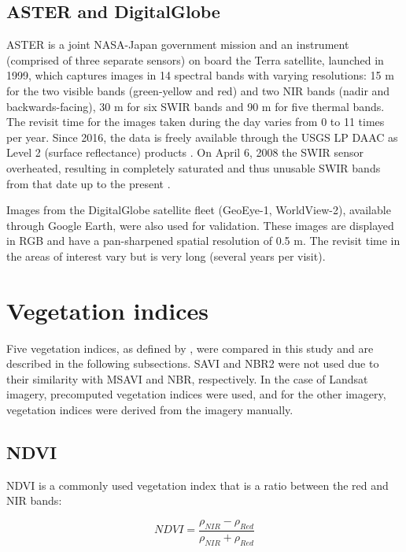 \documentclass[a4paper,12pt]{scrbook}
\begin{document}
\subsection{ASTER and DigitalGlobe}

\ac{ASTER} is a joint NASA-Japan government mission and an instrument (comprised of three separate sensors) on board the Terra satellite, launched in 1999, which captures images in 14 spectral bands with varying resolutions: 15 m for the two visible bands (green-yellow and red) and two \ac{NIR} bands (nadir and backwards-facing), 30 m for six \ac{SWIR} bands and 90 m for five thermal bands. The revisit time for the images taken during the day varies from 0 to 11 times per year. Since 2016, the data is freely available through the \ac{USGS} \ac{LP DAAC} as Level 2 (surface reflectance) products \citep{nasa_lp_daac_aster_2006}. On April 6, 2008 the \ac{SWIR} sensor overheated, resulting in completely saturated and thus unusable \ac{SWIR} bands from that date up to the present \citep{meyer_advanced_2015}.

Images from the DigitalGlobe satellite fleet (GeoEye-1, WorldView-2), available through Google Earth, were also used for validation. These images are displayed in \ac{RGB} and have a pan-sharpened spatial resolution of 0.5 m. The revisit time in the areas of interest vary but is very long (several years per visit).

\section{Vegetation indices} \label{sec-vis}

Five vegetation indices, as defined by \citet{u.s._geological_survey_product_2017_3}, were compared in this study and are described in the following subsections. \ac{SAVI} and \ac{NBR2} were not used due to their similarity with \ac{MSAVI} and \ac{NBR}, respectively. In the case of Landsat imagery, precomputed vegetation indices were used, and for the other imagery, vegetation indices were derived from the imagery manually.

\subsection{NDVI}

\ac{NDVI} is a commonly used vegetation index that is a ratio between the red and \ac{NIR} bands:

$$ NDVI = \frac{\rho_{NIR} - \rho_{Red}}{\rho_{NIR} + \rho_{Red}} $$
\end{document}
